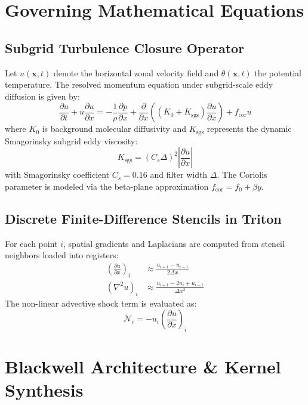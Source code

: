 \documentclass[10pt,twocolumn]{article}
\begin{document}
\section{Governing Mathematical Equations}

\subsection{Subgrid Turbulence Closure Operator}
Let $u(\mathbf{x}, t)$ denote the horizontal zonal velocity field and $\theta(\mathbf{x}, t)$ the potential temperature. The resolved momentum equation under subgrid-scale eddy diffusion is given by:
\begin{equation}
\frac{\partial u}{\partial t} + u \frac{\partial u}{\partial x} = -\frac{1}{\rho}\frac{\partial p}{\partial x} + \frac{\partial}{\partial x}\left( (K_0 + K_{\text{sgs}}) \frac{\partial u}{\partial x} \right) + f_{\text{cor}} u
\end{equation}
where $K_0$ is background molecular diffusivity and $K_{\text{sgs}}$ represents the dynamic Smagorinsky subgrid eddy viscosity:
\begin{equation}
K_{\text{sgs}} = (C_s \Delta)^2 \left| \frac{\partial u}{\partial x} \right|
\end{equation}
with Smagorinsky coefficient $C_s = 0.16$ and filter width $\Delta$. The Coriolis parameter is modeled via the beta-plane approximation $f_{\text{cor}} = f_0 + \beta y$.

\subsection{Discrete Finite-Difference Stencils in Triton}
For each point $i$, spatial gradients and Laplacians are computed from stencil neighbors loaded into registers:
\begin{align}
\left( \frac{\partial u}{\partial x} \right)_i &\approx \frac{u_{i+1} - u_{i-1}}{2\Delta x} \\
(\nabla^2 u)_i &\approx \frac{u_{i+1} - 2u_i + u_{i-1}}{\Delta x^2}
\end{align}
The non-linear advective shock term is evaluated as:
\begin{equation}
\mathcal{N}_i = -u_i \left( \frac{\partial u}{\partial x} \right)_i
\end{equation}

\section{Blackwell Architecture \& Kernel Synthesis}
\end{document}
